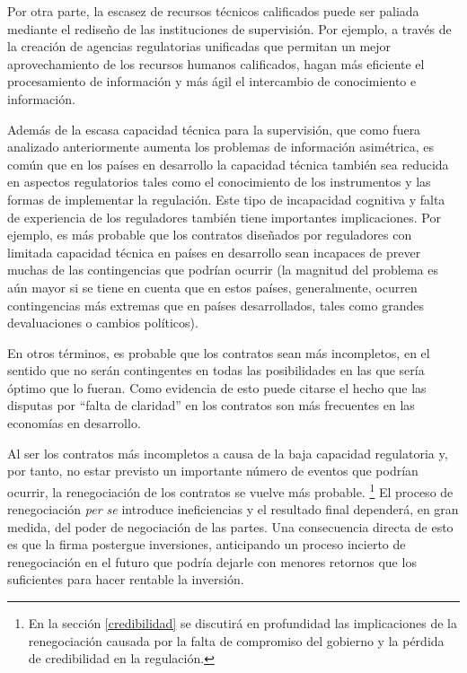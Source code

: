 \documentclass[
  12pt,
  spanish,
]{book}
\begin{document}
Por otra parte, la escasez de recursos técnicos calificados puede ser paliada mediante el rediseño de las instituciones de supervisión. Por ejemplo, a través de la creación de agencias regulatorias unificadas que permitan un mejor aprovechamiento de los recursos humanos calificados, hagan más eficiente el procesamiento de información y más ágil el
intercambio de conocimiento e información.

Además de la escasa capacidad técnica para la supervisión, que como fuera analizado anteriormente aumenta los problemas de información asimétrica, es común que en los países en desarrollo la capacidad técnica también sea reducida en aspectos regulatorios tales como el conocimiento de los instrumentos y las formas de implementar la regulación. Este tipo de incapacidad cognitiva y falta de experiencia de los reguladores también tiene importantes implicaciones. Por ejemplo, es más probable que los contratos diseñados por reguladores con limitada capacidad técnica en países en desarrollo sean incapaces de prever muchas de las contingencias que podrían ocurrir (la magnitud del problema es aún mayor si se tiene en cuenta que en estos países, generalmente, ocurren
contingencias más extremas que en países desarrollados, tales como grandes
devaluaciones o cambios políticos).

En otros términos, es probable que los contratos sean más incompletos, en el sentido que no serán contingentes en todas las posibilidades en las que sería óptimo que lo fueran. Como evidencia de esto puede citarse el hecho que las disputas por ``falta de claridad'' en los contratos son más frecuentes en las economías en desarrollo.

Al ser los contratos más incompletos a causa de la baja capacidad regulatoria y, por tanto, no estar previsto un importante número de eventos que podrían ocurrir, la renegociación de los contratos se vuelve más probable.
\footnote{En la sección \ref{credibilidad} se discutirá en profundidad las implicaciones de la renegociación causada por la falta de compromiso del gobierno y la pérdida de credibilidad en la regulación.}
El proceso de renegociación \emph{per se} introduce ineficiencias y el resultado final dependerá, en gran medida, del poder de negociación de las partes. Una consecuencia directa de esto es que la firma postergue inversiones, anticipando un proceso incierto de renegociación en el futuro que podría dejarle con menores retornos que los suficientes para hacer rentable la inversión.
\end{document}
